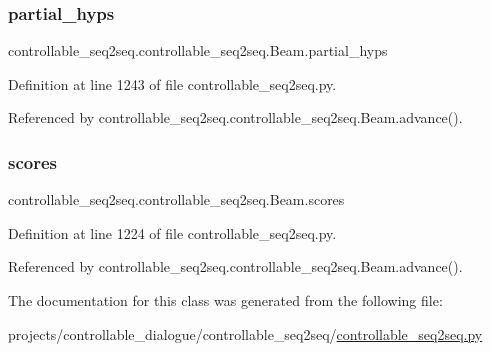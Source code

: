 \subsubsection{\texorpdfstring{partial\+\_\+hyps}{partial\_hyps}}
{\footnotesize\ttfamily controllable\+\_\+seq2seq.\+controllable\+\_\+seq2seq.\+Beam.\+partial\+\_\+hyps}



Definition at line 1243 of file controllable\+\_\+seq2seq.\+py.



Referenced by controllable\+\_\+seq2seq.\+controllable\+\_\+seq2seq.\+Beam.\+advance().

\mbox{\label{classcontrollable__seq2seq_1_1controllable__seq2seq_1_1Beam_ad53544456c857b36a11877f259ea2296}} 
\subsubsection{\texorpdfstring{scores}{scores}}
{\footnotesize\ttfamily controllable\+\_\+seq2seq.\+controllable\+\_\+seq2seq.\+Beam.\+scores}



Definition at line 1224 of file controllable\+\_\+seq2seq.\+py.



Referenced by controllable\+\_\+seq2seq.\+controllable\+\_\+seq2seq.\+Beam.\+advance().



The documentation for this class was generated from the following file\+:\begin{DoxyCompactItemize}
\item 
projects/controllable\+\_\+dialogue/controllable\+\_\+seq2seq/\hyperlink{controllable__seq2seq_8py}{controllable\+\_\+seq2seq.\+py}\end{DoxyCompactItemize}
